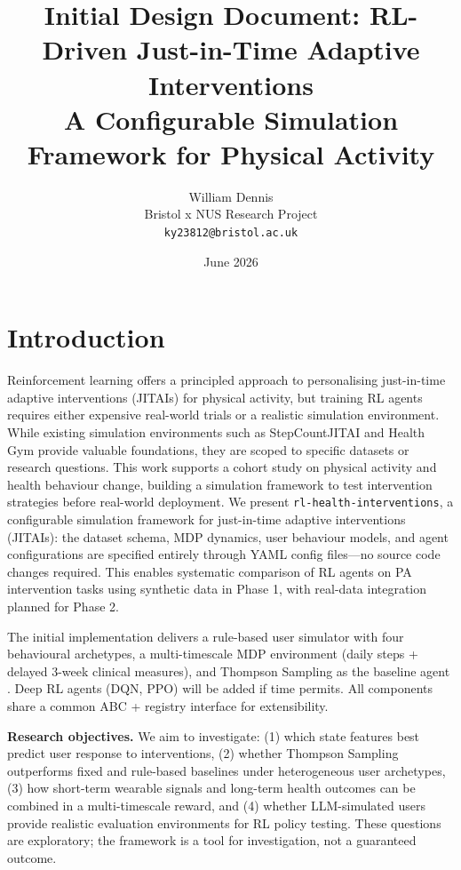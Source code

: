 \documentclass[11pt,a4paper]{article}
\title{Initial Design Document: RL-Driven Just-in-Time Adaptive Interventions\\
\large A Configurable Simulation Framework for Physical Activity}
\author{William Dennis\\
Bristol x NUS Research Project\\
\texttt{ky23812@bristol.ac.uk}}
\date{June 2026}
\begin{document}
\maketitle
\tableofcontents

\newpage

\section{Introduction}
\label{sec:intro}

Reinforcement learning offers a principled approach to personalising
just-in-time adaptive interventions (JITAIs) for physical activity, but
training RL agents requires either expensive real-world trials or a realistic
simulation environment. While existing simulation environments such as
StepCountJITAI \cite{karine2024stepcountjitai} and Health Gym
\cite{gateno2023healthgym} provide valuable foundations, they are scoped to
specific datasets or research questions. This work supports a cohort study on physical activity and health behaviour change, building a simulation framework to test intervention strategies before real-world deployment. We present \texttt{rl-health-interventions},
a configurable simulation framework for just-in-time adaptive interventions (JITAIs):
the dataset schema, MDP dynamics, user behaviour models, and agent configurations
are specified entirely through YAML config files---no source code changes
required. This enables systematic comparison of RL agents on PA intervention
tasks using synthetic data in Phase 1, with real-data integration planned for
Phase 2.

The initial implementation delivers a rule-based user simulator with four
behavioural archetypes, a multi-timescale MDP environment (daily steps +
delayed 3-week clinical measures), and Thompson Sampling as the baseline
agent \cite{karine2024stepcountjitai,klasnja2019heartsteps}. Deep RL agents
(DQN, PPO) will be added if time permits. All
components share a common ABC + registry interface for extensibility.

\textbf{Research objectives.} We aim to investigate: (1) which state features best predict user response to interventions, (2) whether Thompson Sampling outperforms fixed and rule-based baselines under heterogeneous user archetypes, (3) how short-term wearable signals and long-term health outcomes can be combined in a multi-timescale reward, and (4) whether LLM-simulated users provide realistic evaluation environments for RL policy testing. These questions are exploratory; the framework is a tool for investigation, not a guaranteed outcome.
\end{document}
